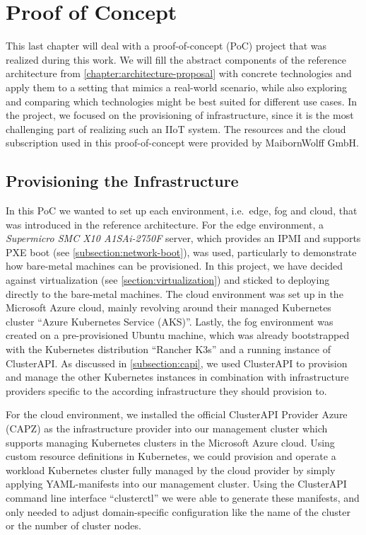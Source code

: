 \chapter{Proof of Concept}
\label{chapter:poc}

    This last chapter will deal with a proof-of-concept (PoC) project that was realized during this work. We will fill the abstract components of the reference architecture from \autoref{chapter:architecture-proposal} with concrete technologies and apply them to a setting that mimics a real-world scenario, while also exploring and comparing which technologies might be best suited for different use cases. In the project, we focused on the provisioning of infrastructure, since it is the most challenging part of realizing such an IIoT system. The resources and the cloud subscription used in this proof-of-concept were provided by MaibornWolff GmbH.

    \section{Provisioning the Infrastructure}

        In this PoC we wanted to set up each environment, i.e.\ edge, fog and cloud, that was introduced in the reference architecture. For the edge environment, a \textit{Supermicro SMC X10 A1SAi-2750F} server, which provides an IPMI and supports PXE boot (see \autoref{subsection:network-boot}), was used, particularly to demonstrate how bare-metal machines can be provisioned. In this project, we have decided against virtualization (see \autoref{section:virtualization}) and sticked to deploying directly to the bare-metal machines. The cloud environment was set up in the Microsoft Azure cloud, mainly revolving around their managed Kubernetes cluster ``Azure Kubernetes Service (AKS)''. Lastly, the fog environment was created on a pre-provisioned Ubuntu machine, which was already bootstrapped with the Kubernetes distribution ``Rancher K3s'' and a running instance of ClusterAPI. As discussed in \autoref{subsection:capi}, we used ClusterAPI to provision and manage the other Kubernetes instances in combination with infrastructure providers specific to the according infrastructure they should provision to. \newline
    
        For the cloud environment, we installed the official ClusterAPI Provider Azure (CAPZ) \cite{azure_capi_provider} as the infrastructure provider into our management cluster which supports managing Kubernetes clusters in the Microsoft Azure cloud. Using custom resource definitions in Kubernetes, we could provision and operate a workload Kubernetes cluster fully managed by the cloud provider by simply applying YAML-manifests into our management cluster. Using the ClusterAPI command line interface ``clusterctl'' we were able to generate these manifests, and only needed to adjust domain-specific configuration like the name of the cluster or the number of cluster nodes. \newline

